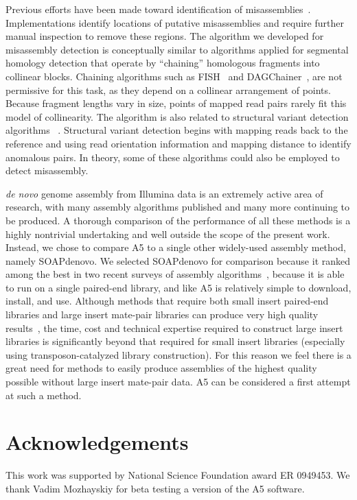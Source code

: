 \documentclass{bioinfo}
\begin{document}
Previous efforts have been made toward identification of misassemblies~\citep{Phillippy2008}. Implementations identify locations of putative 
misassemblies and require further manual inspection to remove these regions. The algorithm we developed for misassembly detection is conceptually 
similar to algorithms applied for segmental homology detection that operate by ``chaining'' homologous fragments into collinear blocks. Chaining 
algorithms such as FISH~\citep{Calabrese2003} and DAGChainer~\citep{Haas2004}, are not permissive for this task, as they depend on a 
collinear arrangement of points. Because fragment lengths vary in size, points of mapped read pairs rarely fit this model of collinearity. The algorithm is also related to structural variant detection 
algorithms ~\citep{BreakDancer,SVDetect}. Structural variant detection begins with mapping reads back to the reference and using read orientation 
information and mapping distance to identify anomalous pairs. In theory, some of these algorithms could also be employed to detect misassembly.  

\emph{de novo} genome assembly from Illumina data is an extremely active area of research, with many assembly algorithms published and many more continuing to be produced.
A thorough comparison of the performance of all these methods is a highly nontrivial undertaking and well outside the scope of the present  
work. Instead, we chose to compare A5 to a single other widely-used assembly method, namely SOAPdenovo. We selected SOAPdenovo for comparison
because it ranked among the best in two recent surveys of assembly algorithms~\citep{Earl2011,Salzberg2011}, because it is able to run on a single paired-end
library, and like A5 is relatively simple to download, install, and use. Although methods that require both small insert paired-end libraries
and large insert mate-pair libraries can produce very high quality results~\citep{Gnerre2011}, the time, cost and technical expertise required to construct large insert
libraries is significantly beyond that required for small insert libraries (especially using transposon-catalyzed library construction).
For this reason we feel there is a great need for methods to easily produce assemblies of the highest quality possible without large insert mate-pair data.
A5 can be considered a first attempt at such a method.

\section*{Acknowledgements}
This work was supported by National Science Foundation award ER 0949453. We thank Vadim Mozhayskiy for beta testing a
version of the A5 software.
\end{document}
